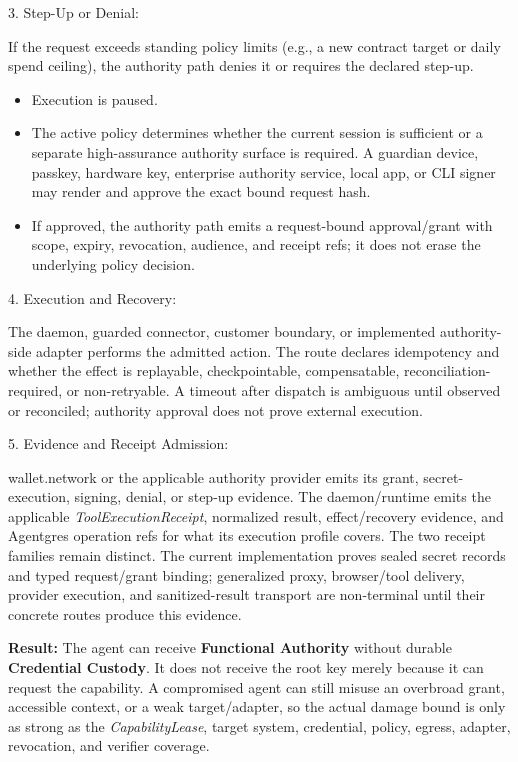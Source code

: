 \documentclass[
  11pt,
]{article}
\providecommand{\tightlist}{%
  \setlength{\itemsep}{0pt}\setlength{\parskip}{0pt}}
\begin{document}
3. Step-Up or Denial:

If the request exceeds standing policy limits (e.g., a new contract target or
daily spend ceiling), the authority path denies it or requires the declared
step-up.

\begin{itemize}
\tightlist
\item
  Execution is paused.
\item
  The active policy determines whether the current session is sufficient or a
  separate high-assurance authority surface is required. A guardian device,
  passkey, hardware key, enterprise authority service, local app, or CLI signer
  may render and approve the exact bound request hash.
\item
  If approved, the authority path emits a request-bound approval/grant with
  scope, expiry, revocation, audience, and receipt refs; it does not erase the
  underlying policy decision.
\end{itemize}

4. Execution and Recovery:

The daemon, guarded connector, customer boundary, or implemented
authority-side adapter performs the admitted action. The route declares
idempotency and whether the effect is replayable, checkpointable,
compensatable, reconciliation-required, or non-retryable. A timeout after
dispatch is ambiguous until observed or reconciled; authority approval does not
prove external execution.

5. Evidence and Receipt Admission:

wallet.network or the applicable authority provider emits its grant,
secret-execution, signing, denial, or step-up evidence. The daemon/runtime emits
the applicable \emph{ToolExecutionReceipt}, normalized result, effect/recovery
evidence, and Agentgres operation refs for what its execution profile covers.
The two receipt families remain distinct. The current implementation proves
sealed secret records and typed request/grant binding; generalized proxy,
browser/tool delivery, provider execution, and sanitized-result transport are
non-terminal until their concrete routes produce this evidence.

\textbf{Result:} The agent can receive \textbf{Functional Authority} without
durable \textbf{Credential Custody}. It does not receive the root key merely
because it can request the capability. A compromised agent can still misuse an
overbroad grant, accessible context, or a weak target/adapter, so the actual
damage bound is only as strong as the \emph{CapabilityLease}, target system,
credential, policy, egress, adapter, revocation, and verifier coverage.
\end{document}
